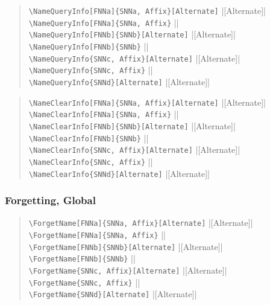 \documentclass[oneside]{article}
\begin{document}
\begin{quote}
\Verb+\NameQueryInfo[FNNa]{SNNa, Affix}[Alternate]+\dotfill
  |[Alternate]|\\
\Verb+\NameQueryInfo[FNNa]{SNNa, Affix}+\dotfill
  ||\\
\Verb+\NameQueryInfo[FNNb]{SNNb}[Alternate]+\dotfill
  |[Alternate]|\\
\Verb+\NameQueryInfo[FNNb]{SNNb}+\dotfill
  ||\\
\Verb+\NameQueryInfo{SNNc, Affix}[Alternate]+\dotfill
  |[Alternate]|\\
\Verb+\NameQueryInfo{SNNc, Affix}+\dotfill
  ||\\
\Verb+\NameQueryInfo{SNNd}[Alternate]+\dotfill
  |[Alternate]|
\end{quote}

\begin{quote}
\Verb+\NameClearInfo[FNNa]{SNNa, Affix}[Alternate]+\dotfill
  |[Alternate]|\\
\Verb+\NameClearInfo[FNNa]{SNNa, Affix}+\dotfill
  ||\\
\Verb+\NameClearInfo[FNNb]{SNNb}[Alternate]+\dotfill
  |[Alternate]|\\
\Verb+\NameClearInfo[FNNb]{SNNb}+\dotfill
  ||\\
\Verb+\NameClearInfo{SNNc, Affix}[Alternate]+\dotfill
  |[Alternate]|\\
\Verb+\NameClearInfo{SNNc, Affix}+\dotfill
  ||\\
\Verb+\NameClearInfo{SNNd}[Alternate]+\dotfill
  |[Alternate]|
\end{quote}

\subsubsection{Forgetting, Global}

\begin{quote}
\Verb+\ForgetName[FNNa]{SNNa, Affix}[Alternate]+\dotfill
  |[Alternate]|\\
\Verb+\ForgetName[FNNa]{SNNa, Affix}+\dotfill
  ||\\
\Verb+\ForgetName[FNNb]{SNNb}[Alternate]+\dotfill
  |[Alternate]|\\
\Verb+\ForgetName[FNNb]{SNNb}+\dotfill
  ||\\
\Verb+\ForgetName{SNNc, Affix}[Alternate]+\dotfill
  |[Alternate]|\\
\Verb+\ForgetName{SNNc, Affix}+\dotfill
  ||\\
\Verb+\ForgetName{SNNd}[Alternate]+\dotfill
  |[Alternate]|
\end{quote}
\end{document}
